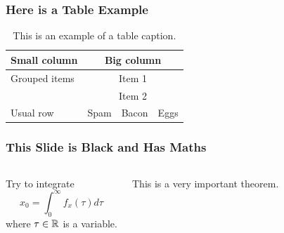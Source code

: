 \documentclass[fleqn]{ingenuitylabs-slides}
\begin{document}

\SlideWhite
\begin{frame}
    \frametitle{Here is a Table Example}
    \begin{table}
        \caption{This is an example of a table caption.}
        \flushleft
        \begin{tabular}{lccc}
            \toprule
                \bf Small column & \multicolumn{3}{c}{\bf Big column} \\
            \midrule
                Grouped items & \multicolumn{3}{c}{Item 1} \\
            \cmidrule{2-4}
                & \multicolumn{3}{c}{Item 2} \\
            \midrule
                Usual row & Spam & Bacon & Eggs \\
            \bottomrule
        \end{tabular}
    \end{table}
\end{frame}




\SlideBlack
\begin{frame}
    \frametitle{This Slide is Black and Has Maths}
    \begin{columns}
        Try to integrate
        \begin{equation}
            x_0=\int_0^\infty f_x(\tau)d\tau
        \end{equation}
        where $\tau\in\mathbb R$ is a variable.
        \begin{thm}
            This is a very important theorem.
        \end{thm}
    \end{columns}
\end{frame}

\end{document}
